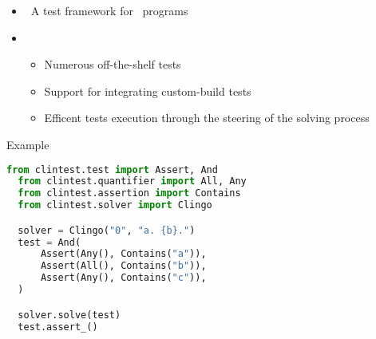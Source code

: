 \begin{frame}{\clintest}
  \begin{itemize}
  \item {} \ A test framework for \clingo\ programs
  \item {}
    \begin{itemize}
      \item Numerous off-the-shelf tests
      \item Support for integrating custom-build tests
      \item Efficent tests execution through the steering of the solving process
    \end{itemize}
  \end{itemize}
\end{frame}
\begin{frame}[fragile]{Example}
  \begin{lstlisting}[language=python,basicstyle=\small\ttfamily]
  from clintest.test import Assert, And
  from clintest.quantifier import All, Any
  from clintest.assertion import Contains
  from clintest.solver import Clingo

  solver = Clingo("0", "a. {b}.")
  test = And(
      Assert(Any(), Contains("a")),
      Assert(All(), Contains("b")),
      Assert(Any(), Contains("c")),
  )

  solver.solve(test)
  test.assert_()
  \end{lstlisting}
  \end{frame}
%
